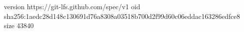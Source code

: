version https://git-lfs.github.com/spec/v1
oid sha256:1aedc28d148c130691d76a8308a03518b700d2f99d60c06eddac163286edfce8
size 43840
